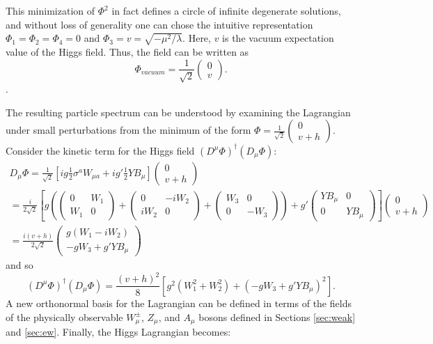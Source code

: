 This minimization of $\Phi^2$ in fact defines a circle of infinite degenerate solutions, and without loss of generality one can chose the intuitive representation $\Phi_1=\Phi_2=\Phi_4=0$ and $\Phi_3=v=\sqrt{-\mu^2/\lambda}$. Here, $v$ is the vacuum expectation value of the Higgs field. Thus, the field can be written as $$\Phi_{vacuum}=\frac{1}{\sqrt{2}}\begin{pmatrix}0 \\ v\end{pmatrix}.$$.

The resulting particle spectrum can be understood by examining the Lagrangian under small perturbations from the minimum of the form $\Phi=\frac{1}{\sqrt{2}}\begin{pmatrix}0 \\ v+h\end{pmatrix}$. Consider the kinetic term for the Higgs field $(D^{\mu}\Phi)^{\dagger}(D_{\mu}\Phi)$:
\begin{gather*}
D_{\mu}\Phi=\frac{1}{\sqrt{2}}[ig\frac{1}{2}\sigma^aW_{\mu a}+ig'\frac{1}{2}YB_{\mu}] \begin{pmatrix}0 \\ v+h\end{pmatrix}\\
= \frac{i}{2\sqrt{2}}[g(\begin{pmatrix} 0 & W_1 \\ W_1 & 0\end{pmatrix} + \begin{pmatrix} 0 & -iW_2 \\ iW_2 & 0\end{pmatrix} + \begin{pmatrix} W_3 & 0 \\ 0 & -W_3\end{pmatrix})+ g'\begin{pmatrix} YB_{\mu} & 0 \\ 0 & YB_{\mu}\end{pmatrix}] \begin{pmatrix} 0 \\ v+h\end{pmatrix}\\
= \frac{i(v+h)}{2\sqrt{2}} \begin{pmatrix}g(W_1-iW_2) \\ -gW_3+g'YB_{\mu}\end{pmatrix}
\end{gather*}
and so
$$
(D^{\mu}\Phi)^{\dagger}(D_{\mu}\Phi)=\frac{(v+h)^2}{8}[g^2(W_1^2+W_2^2)+(-gW_3+g'YB_{\mu})^2].
$$
A new orthonormal basis for the Lagrangian can be defined in terms of the fields of the physically observable $W^{\pm}_{\mu}$, $Z_{\mu}$, and $A_{\mu}$ bosons defined in Sections \ref{sec:weak} and \ref{sec:ew}. Finally, the Higgs Lagrangian becomes:
